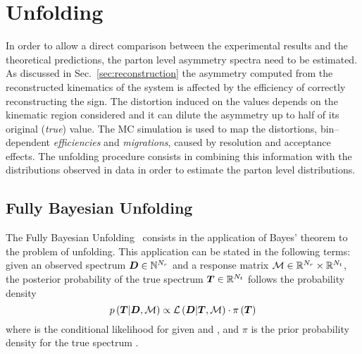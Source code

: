 \chapter{Unfolding}
\label{sec:unfolding}

In order to allow a direct comparison between the experimental results
and the theoretical predictions, the parton level asymmetry spectra need
to be estimated.
As discussed in Sec.~\ref{sec:reconstruction} the asymmetry computed
from the reconstructed kinematics of the \ttbar{} system is affected
by the efficiency of correctly reconstructing the \dy{} sign. The
distortion induced on the \ac{} values depends on the kinematic region
considered and it can dilute the asymmetry up to half of its original
({\it true}) value.
The \ttbar{} MC simulation is used to map the distortions,
bin--dependent {\it efficiencies} and {\it migrations}, caused by
resolution and acceptance effects. The unfolding procedure consists in
combining this information with the distributions observed in data in
order to estimate the parton level distributions. 

\section{Fully Bayesian Unfolding}
\label{sec:fbu}

The Fully Bayesian Unfolding~\cite{fbu} consists in the application of Bayes'
theorem to the problem of unfolding. This application can be stated in
the following terms: given an observed spectrum
$\boldsymbol{D}\in\mathbb{N}^{N_r}$ and a response matrix
$\mathcal{M}\in\mathbb{R}{}^{N_r}\times{}\mathbb{R}{}^{N_t}$, the posterior
probability of the true spectrum $\boldsymbol{T}{}\in{}\mathbb{R}{}^{N_t}$ follows
the probability density
\begin{equation}
p\left(\boldsymbol{T}{}|\boldsymbol{D}{},\mathcal{M}{}\right)
\propto{}
\mathcal{L}\left(\boldsymbol{D}{}|\boldsymbol{T}{},\mathcal{M}{}\right)
\cdot{}
\pi{}\left(\boldsymbol{T}{}\right)
\end{equation}
where \conditionalLhood{\Data{}}{\Truth{},\TrasfMatrix{}} is the
conditional likelihood for \Data{} given \Truth{} and \TrasfMatrix{},
and $\pi{}$ is the prior probability density for the true spectrum \Truth{}.

